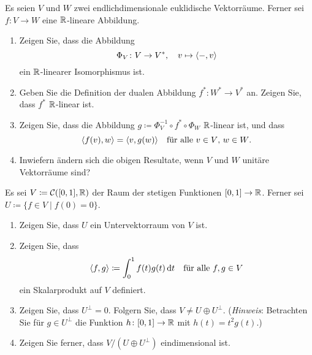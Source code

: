 \documentclass[a4paper,10pt]{scrartcl}
\begin{document}


\begin{question}
  Es seien $V$ und $W$ zwei endlichdimensionale euklidische Vektorräume.
  Ferner sei $f \colon V \to W$ eine $\mathbb{R}$-lineare Abbildung.
  \begin{enumerate}[leftmargin=*]
    \item
      Zeigen Sie, dass die Abbildung
      \[
        \Phi_V \colon V \to V^*,
        \quad
        v \mapsto \langle -, v \rangle
      \]
      ein $\mathbb{R}$-linearer Isomorphismus ist.
    \item
      Geben Sie die Definition der dualen Abbildung $f^* \colon W^* \to V^*$ an.
      Zeigen Sie, dass $f^*$ $\mathbb{R}$-linear ist.
    \item
      Zeigen Sie, dass die Abbildung $g \coloneqq \Phi_V^{-1} \circ f^* \circ \Phi_W$ $\mathbb{R}$-linear ist, und dass
      \[
        \langle f(v), w \rangle = \langle v, g(w) \rangle
        \quad
        \text{für alle $v \in V$, $w \in W$}.
      \]
    \item
      Inwiefern ändern sich die obigen Resultate, wenn $V$ und $W$ unitäre Vektorräume sind?
  \end{enumerate}
\end{question}


\begin{question}
  Es sei $V \coloneqq \mathcal{C}([0,1], \mathbb{R})$ der Raum der stetigen Funktionen $[0,1] \to \mathbb{R}$.
  Ferner sei $U \coloneqq \{f \in V \mid f(0) = 0\}$.
  \begin{enumerate}
    \item
      Zeigen Sie, dass $U$ ein Untervektorraum von $V$ ist.
    \item
      Zeigen Sie, dass
      \[
        \langle f, g \rangle \coloneqq \int_0^1 f(t) g(t) \,\text{d}t
        \quad
        \text{für alle $f, g \in V$}
      \]
      ein Skalarprodukt auf $V$ definiert.
    \item
      Zeigen Sie, dass $U^\perp = 0$.
      Folgern Sie, dass $V \neq U \oplus U^\perp$.
      (\emph{Hinweis}: Betrachten Sie für $g \in U^\perp$ die Funktion $h \colon [0,1] \to \mathbb{R}$ mit $h(t) = t^2 g(t)$.)
    \item
      Zeigen Sie ferner, dass $V/(U \oplus U^\perp)$ eindimensional ist.
  \end{enumerate}
\end{question}
\end{document}
